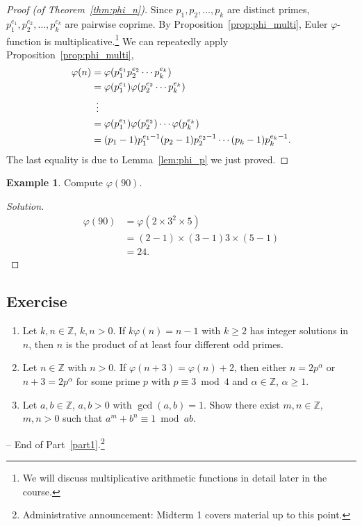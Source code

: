 \documentclass{amsbook}
\theoremstyle{plain}
\theoremstyle{definition}
\newtheorem{example}[theorem]{Example}
\theoremstyle{remark}
\numberwithin{equation}{chapter}
\numberwithin{figure}{chapter}
\newcommand{\Z}{\mathbb{Z}}
\begin{document}
\begin{proof}[Proof {\rm (of Theorem~\ref{thm:phi_n})}]
  Since $p_1, p_2, \ldots, p_k$ are distinct primes, $p_1^{e_1}, p_2^{e_2}, \ldots, p_k^{e_k}$ are pairwise coprime. By Proposition~\ref{prop:phi_multi}, Euler $\varphi$-function is multiplicative.\footnote{We will discuss multiplicative arithmetic functions in detail later in the course.} We can repeatedly apply Proposition~\ref{prop:phi_multi},
  \begin{align}
    \varphi(n) &= \varphi(p_1^{e_1}p_2^{e_2}\cdots p_k^{e_k}) \\
               &= \varphi(p_1^{e_1}) \varphi(p_2^{e_2}\cdots p_k^{e_k}) \\
               & \hspace{1.8mm} \vdots  \\
               &= \varphi(p_1^{e_1})\varphi(p_2^{e_2}) \cdots \varphi(p_k^{e_k}) \\
               &= (p_1 - 1)p_1^{e_1-1}(p_2 - 1)p_2^{e_2-1}\cdots (p_k - 1)p_k^{e_k-1}.
  \end{align}
  The last equality is due to Lemma~\ref{lem:phi_p} we just proved.
\end{proof}
\begin{example}
  Compute $\varphi(90)$.
\end{example}
\begin{proof}[Solution]
  \begin{align}
    \varphi(90) &= \varphi(2 \times 3^2 \times 5) \\
                &= (2-1) \times (3-1)3 \times (5-1) \\
                &= 24.
  \end{align}
\end{proof}
\subsection*{Exercise}
\begin{enumerate}
\item Let $k, n \in \Z$, $k, n > 0$. If $k \varphi(n) = n - 1$ with $k \geqslant 2$ has integer solutions in $n$, then $n$ is the product of at least four different odd primes.
\item Let $n \in \Z$ with $n > 0$. If $\varphi (n+3) = \varphi (n) + 2$, then either $n = 2 p^\alpha$ or $n + 3 = 2 p^\alpha$ for some prime $p$ with $p \equiv 3 \bmod 4$ and $\alpha \in \Z$, $\alpha \geqslant 1$.
\item Let $a, b \in \Z$, $a, b > 0$ with $\gcd (a, b) = 1$. Show there exist $m, n \in \Z$, $m, n > 0$ such that $a^m + b^n \equiv 1 \bmod ab$.
\end{enumerate}
-- End of Part~\ref{part1}.\footnote{Administrative announcement: Midterm 1 covers material up to this point.}
\end{document}
